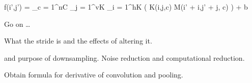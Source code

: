 \startformula
f(i',j') = \sum_{c = 1}^{nC} \sum_{j = 1}^{vK} \sum_{i = 1}^{hK} \Bigl( K(i,j,c) \cdot M(i' + i,j' + j, c) \Bigr) + b
\stopformula
\stopsubsection

Go on \dots

\startsubsection[title=Multiple channels]
\stopsubsection

\startsubsubsection[title=Altering the stride]
What the stride is and the effects of altering it.
\stopsubsubsection

\startsubsubsection[title=Zero padding]
\stopsubsubsection

 and purpose of downsampling.
Noise reduction and computational reduction.
\stopsubsection

\startsubsection[title=Backward Propagation]
Obtain formula for derivative of convolution and pooling.
\stopsubsection
\stopsection